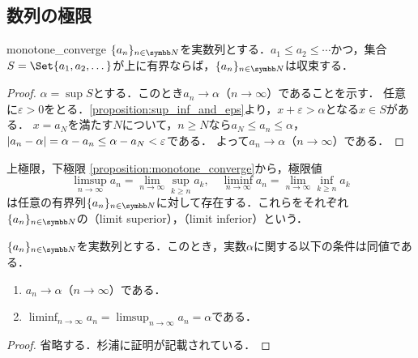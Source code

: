 \documentclass[../../main]{subfiles}
\begin{document}
\subsection{数列の極限}

\begin{proposition}{}{monotone_converge}
  \(\seq{a_n}_{n\in\numset{N}}\)を実数列とする．\(a_1\leq a_2\leq\dotsb\)かつ，集合\(S=\Set{a_1,a_2,\dotsc}\)が上に有界ならば，\(\seq{a_n}_{n\in\numset{N}}\)は収束する．
\end{proposition}

\begin{proof}
  \(\alpha=\sup S\)とする．このとき\(a_n\to\alpha\)（\(n\to\infty\)）であることを示す．
  任意に\(\varepsilon>0\)をとる．\cref{proposition:sup_inf_and_eps}より，\(x+\varepsilon>\alpha\)となる\(x\in S\)がある．
  \(x=a_N\)を満たす\(N\)について，\(n\geq N\)なら\(a_N\leq a_n\leq\alpha\)，\(\lvert a_n-\alpha\rvert=\alpha-a_n\leq\alpha-a_N<\varepsilon\)である．
  よって\(a_n\to\alpha\)（\(n\to\infty\)）である．
\end{proof}

\begin{definition}{上極限，下極限}{}
  \cref{proposition:monotone_converge}から，極限値
  \[
    \limsup_{n\to\infty}a_n = \lim_{n\to\infty}\sup_{k\geq n}a_k,
    \quad\liminf_{n\to\infty}a_n = \lim_{n\to\infty}\inf_{k\geq n}a_k
  \]
  は任意の有界列\(\seq{a_n}_{n\in\numset{N}}\)に対して存在する．これらをそれぞれ\(\seq{a_n}_{n\in\numset{N}}\)の（limit superior），（limit inferior）という．
\end{definition}

\begin{proposition}{}{}
  \(\seq{a_n}_{n\in\numset{N}}\)を実数列とする．このとき，実数\(\alpha\)に関する以下の条件は同値である．
  \begin{enumerate}
    \item \(a_n\to\alpha\)（\(n\to\infty\)）である．
    \item \(\liminf_{n\to\infty}a_n=\limsup_{n\to\infty}a_n=\alpha\)である．
  \end{enumerate}
\end{proposition}

\begin{proof}
  省略する．杉浦\cite{sugiura2018}に証明が記載されている．
\end{proof}
\end{document}
